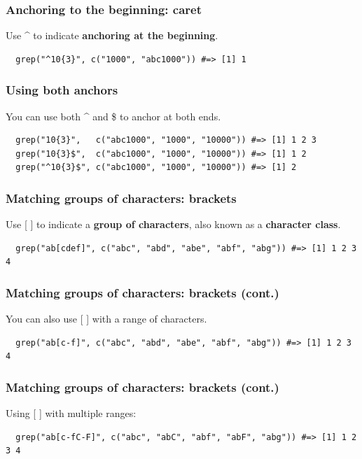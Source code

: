 \documentclass{beamer}
\begin{document}
\begin{frame}[fragile]
  \frametitle{Anchoring to the beginning: caret}
  Use \^{} to indicate \textbf{anchoring at the beginning}.
  \vspace{3mm}

\begin{verbatim}
  grep("^10{3}", c("1000", "abc1000")) #=> [1] 1
\end{verbatim}
\end{frame}
\begin{frame}[fragile]
  \frametitle{Using both anchors}
  You can use both \^{} and \$ to anchor at both ends.
  \vspace{3mm}

\begin{verbatim}
  grep("10{3}",   c("abc1000", "1000", "10000")) #=> [1] 1 2 3
  grep("10{3}$",  c("abc1000", "1000", "10000")) #=> [1] 1 2
  grep("^10{3}$", c("abc1000", "1000", "10000")) #=> [1] 2
\end{verbatim}
\end{frame}
\begin{frame}[fragile]
  \frametitle{Matching groups of characters: brackets}
  Use [ ] to indicate a \textbf{group of characters}, also known as a \textbf{character class}.
  \vspace{3mm}

\begin{verbatim}
  grep("ab[cdef]", c("abc", "abd", "abe", "abf", "abg")) #=> [1] 1 2 3 4
\end{verbatim}
\end{frame}
\begin{frame}[fragile]
  \frametitle{Matching groups of characters: brackets (cont.)}
  You can also use [ ] with a range of characters.
  \vspace{3mm}

\begin{verbatim}
  grep("ab[c-f]", c("abc", "abd", "abe", "abf", "abg")) #=> [1] 1 2 3 4
\end{verbatim}
\end{frame}
\begin{frame}[fragile]
  \frametitle{Matching groups of characters: brackets (cont.)}
  Using [ ] with multiple ranges:
  \vspace{3mm}

\begin{verbatim}
  grep("ab[c-fC-F]", c("abc", "abC", "abf", "abF", "abg")) #=> [1] 1 2 3 4
\end{verbatim}
\end{frame}
\end{document}
